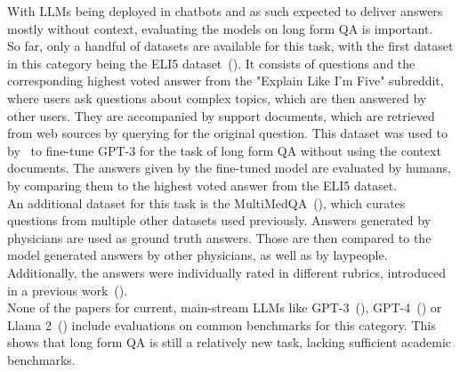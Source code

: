 With LLMs being deployed in chatbots and as such expected to deliver answers mostly without context, evaluating the models on long form QA is important.
\\
So far, only a handful of datasets are available for this task, with the first dataset in this category being the ELI5 dataset~(\cite{fan:2019:ELI5}).
It consists of questions and the corresponding highest voted answer from the "Explain Like I'm Five" subreddit, where users ask questions about complex topics, which are then answered by other users.
They are accompanied by support documents, which are retrieved from web sources by querying for the original question.
This dataset was used to by~\cite{nakano:2021:Webgpt} to fine-tune GPT-3 for the task of long form QA without using the context documents.
The answers given by the fine-tuned model are evaluated by humans, by comparing them to the highest voted answer from the ELI5 dataset.
\\ 
An additional dataset for this task is the MultiMedQA~(\cite{singhal:2023:Towards}), which curates questions from multiple other datasets used previously. 
Answers generated by physicians are used as ground truth answers.
Those are then compared to the model generated answers by other physicians, as well as by laypeople.
Additionally, the answers were individually rated in different rubrics, introduced in a previous work~(\cite{singhal:2022:Large}).
\\
None of the papers for current, main-stream LLMs like GPT-3~(\cite{brown:2020:Language}), GPT-4~(\cite{openai:2023:GPT}) or Llama 2~(\cite{touvron:2023:Llama}) include evaluations on common benchmarks for this category.
This shows that long form QA is still a relatively new task, lacking sufficient academic benchmarks.


